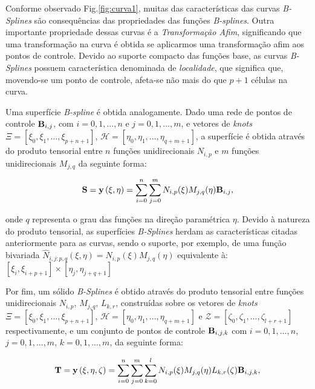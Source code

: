 \documentclass[tese_patricia]{subfiles}
\begin{document}
Conforme observado  Fig.\ref{fig:curva1}, muitas das características das curvas \textit{B-Splines} são consequências das propriedades das funções \textit{B-splines}. Outra importante propriedade dessas curvas é a \textit{Transformação Afim}, significando que uma transformação na curva é obtida  se aplicarmos uma transformação afim aos pontos de controle. Devido ao suporte compacto das funções base, as curvas \textit{B-Splines} possuem característica denominada de \textit{localidade}, que significa que, movendo-se um ponto de controle, afeta-se não mais do que $p+1$ células na curva.

Uma superfície \textit{B-spline} é obtida analogamente. Dado uma rede de pontos de controle $\mathbf{B}_{i,j}$, com $i = 0,1,...,n$ e $j = 0,1,..., m$, e vetores de \textit{knots} $\Xi = \left[\xi_{0},\xi_{1},...,\xi_{p+n+1}\right]$, $\mathcal{H} = \left[\eta_{0},\eta_{1},...,\eta_{q+m+1}\right]$, a superfície é obtida através do produto tensorial entre $n$ funções unidirecionais $N_{i,p}$ e $m$ funções unidirecionais $M_{j,q}$ da seguinte forma:

\begin{align}
\mathbf{S} = \mathbf{y}\left(\xi,\eta\right)  = \sum_{i=0}^{n}\sum_{j=0}^{m}N_{i,p}(\xi)M_{j,q}(\eta)\mathbf{B}_{i,j},
\end{align}

\noindent onde $q$ representa o grau das funções na direção paramétrica $\eta$. Devido à natureza do produto tensorial, as superfícies \textit{B-Splines} herdam as características citadas anteriormente para as curvas, sendo o suporte, por exemplo, de uma função bivariada $\hat{N}_{i,j:p,q}\left(\xi,\eta\right) = N_{i,p}(\xi)M_{j,q}(\eta)$ equivalente à: $\left[\xi_{i},\xi_{i+p+1}\right]\times\left[\eta_{j},\eta_{j+q+1}\right]$

Por fim, um sólido \textit{B-Splines} é obtido através do produto tensorial entre funções unidirecionais $N_{i,p}$, $M_{j,q}$, $L_{k,r}$, construídas sobre os vetores de \textit{knots} $\Xi = \left[\xi_{0},\xi_{1},...,\xi_{p+n+1}\right]$, $\mathcal{H} = \left[\eta_{0},\eta_{1},...,\eta_{q+m+1}\right]$ e $\mathcal{Z} = \left[\zeta_{0},\zeta_{1},...,\zeta_{l+r+1}\right]$ respectivamente, e um conjunto de pontos de controle  $\mathbf{B}_{i,j,k}$ com $i = 0,1,...,n$, $j = 0,1,..., m$, $k = 0,1,..., m$, da seguinte forma:

\begin{align}
\mathbf{T} = \mathbf{y}\left(\xi,\eta,\zeta\right)  = \sum_{i=0}^{n}\sum_{j=0}^{m}\sum_{k=0}^{l}N_{i,p}(\xi)M_{j,q}(\eta)L_{k,r}(\zeta)\mathbf{B}_{i,j,k},
\end{align}
\end{document}
